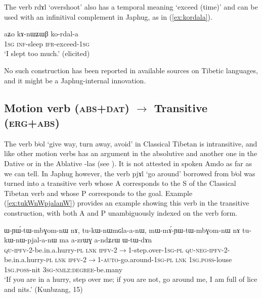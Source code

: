 \documentclass[oldfontcommands,oneside,a4paper,11pt]{article}
\newcommand{\ipa}[1]{{\phon \mbox{#1}}} %
\newcommand{\refb}[1]{(\ref{#1})}
\begin{document}
The verb \ipa{rdɤl} `overshoot' also has a temporal meaning `exceed (time)' and can be used with an infinitival complement in Japhug, as in \refb{ex:kordala}.

\begin{exe}
\ex \label{ex:kordala}
\gll
\ipa{aʑo}  	\ipa{kɤ-nɯʑɯβ}  	\ipa{ko-rdal-a}  \\
\textsc{1sg} \textsc{inf}-sleep \textsc{ifr}-exceed-\textsc{1sg} \\
\glt `I slept too much.' (elicited)
\end{exe}

No such construction has been reported in available sources on Tibetic languages, and it might be a Japhug-internal innovation.

\subsection{Motion verb (\textsc{abs+dat}) $\rightarrow$ Transitive (\textsc{erg+abs})}  
The verb \ipa{bʲol} `give way, turn away, avoid' in Classical Tibetan is intransitive, and like other motion verbs has an argument in the absolutive and another one in the Dative or in the Ablative \ipa{-las} (see \citealt[268]{hill10dictionary}). It is not attested in spoken Amdo as far as we can tell. In Japhug however, the verb \ipa{pjɤl} `go around' borrowed from  \ipa{bʲol} was turned into a transitive verb whose A corresponds to the S of the Classical Tibetan verb and whose P corresponds to the goal. Example \refb{ex:tukWnWpjalanW} provides an example  showing this verb in the transitive construction, with both A and P unambiguously indexed on the verb form.


\begin{exe}
\ex \label{ex:tukWnWpjalanW}
\gll
\ipa{ɯ-ɲɯ́-tɯ-mbɣom-nɯ}  	\ipa{nɤ,}  	\ipa{tu-kɯ-nɯmɢla-a-nɯ,}  \ipa{mɯ-mɤ́-ɲɯ-tɯ-mbɣom-nɯ}  	\ipa{nɤ}  	\ipa{tu-kɯ-nɯ-pjal-a-nɯ}  	\ipa{ma}  	\ipa{a-zrɯɣ}  	\ipa{a-ndʑrɯ}  	\ipa{ɯ-tɯ-dɤn} \\
\textsc{qu-ipfv}-2-be.in.a.hurry-\textsc{pl} \textsc{lnk} \textsc{ipfv}-2$\rightarrow$1-step.over-\textsc{1sg-pl} \textsc{qu-neg-ipfv}-2-be.in.a.hurry-\textsc{pl} \textsc{lnk} \textsc{ipfv}-2$\rightarrow$1-\textsc{auto}-go.around-\textsc{1sg-pl} \textsc{lnk}   \textsc{1sg.poss}-louse \textsc{1sg.poss}-nit \textsc{3sg-nmlz:degree}-be.many \\
\glt `If you are in a hurry, step over me; if you are not, go around me, I am full of lice and nits.' (Kunbzang, 15)
\end{exe}
\end{document}
